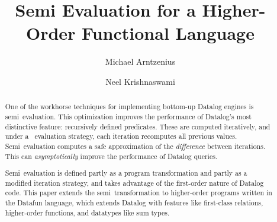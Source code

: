 \documentclass[acmsmall,screen]{acmart}\settopmatter{}
\begin{document}
\title{Semi\naive{} Evaluation for a Higher-Order Functional Language}


\author{Michael Arntzenius}

\author{Neel Krishnaswami}


\begin{abstract}
One of the workhorse techniques for implementing bottom-up Datalog engines is
semi\naive\ evaluation. This optimization improves the performance of Datalog's
most distinctive feature: recursively defined predicates. These are computed
iteratively, and under a \naive\ evaluation strategy, each iteration recomputes
all previous values. Semi\naive\ evaluation computes a safe approximation of
the \emph{difference} between iterations. This can \emph{asymptotically} improve
the performance of Datalog queries.

Semi\naive\ evaluation is defined partly as a program transformation and partly
as a modified iteration strategy, and takes advantage of the first-order nature
of Datalog code.
%
This paper extends the semi\naive\ transformation to higher-order programs
written in the Datafun language, which extends Datalog with features like
first-class relations, higher-order functions, and datatypes like sum types.
\end{abstract}
\end{document}
